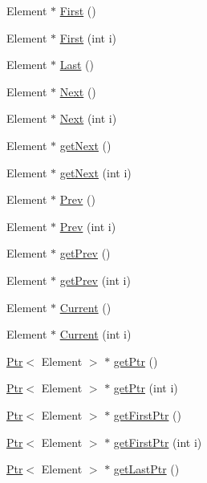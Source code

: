 \begin{CompactItemize}
\item 
Element $\ast$ \hyperlink{classContainer_01da95c79542f8a2e770fce83a99928f}{First} ()
\item 
Element $\ast$ \hyperlink{classContainer_d8149821d1af2a00534c8aacf7a8b847}{First} (int i)
\item 
Element $\ast$ \hyperlink{classContainer_69c8bc0d0f09e172057777ee8604b228}{Last} ()
\item 
Element $\ast$ \hyperlink{classContainer_07f6034601c7bb0379e7e3669a86bdda}{Next} ()
\item 
Element $\ast$ \hyperlink{classContainer_fccf98c4426883812b085ff0d9b610dc}{Next} (int i)
\item 
Element $\ast$ \hyperlink{classContainer_fd45917f5293ac94750cd8c1c5c2c4a9}{getNext} ()
\item 
Element $\ast$ \hyperlink{classContainer_027eaac76676e187ae5f849acb84237a}{getNext} (int i)
\item 
Element $\ast$ \hyperlink{classContainer_80e55ec0997a0af36e7f1326cd8c9e6d}{Prev} ()
\item 
Element $\ast$ \hyperlink{classContainer_6cc7f2c5e4d929dab3afdbdd1d193d14}{Prev} (int i)
\item 
Element $\ast$ \hyperlink{classContainer_980834c42829d68fd640a86aa9d8051e}{getPrev} ()
\item 
Element $\ast$ \hyperlink{classContainer_b75a038f82adad65e3b202b6843cdb4c}{getPrev} (int i)
\item 
Element $\ast$ \hyperlink{classContainer_cbf0295eef7a11efdb07137014ab7e0c}{Current} ()
\item 
Element $\ast$ \hyperlink{classContainer_fbd992e0044ce433a8acd6015a9d876c}{Current} (int i)
\item 
\hyperlink{structPtr}{Ptr}$<$ Element $>$ $\ast$ \hyperlink{classContainer_542e2401c60213071a387ab65fd49814}{getPtr} ()
\item 
\hyperlink{structPtr}{Ptr}$<$ Element $>$ $\ast$ \hyperlink{classContainer_fbc047571e5612343d92794004a947ae}{getPtr} (int i)
\item 
\hyperlink{structPtr}{Ptr}$<$ Element $>$ $\ast$ \hyperlink{classContainer_e2e40811d9c94c5655c21eec097c3c3c}{getFirstPtr} ()
\item 
\hyperlink{structPtr}{Ptr}$<$ Element $>$ $\ast$ \hyperlink{classContainer_a2a2567f909060ce9fd33ef25bfbe2cb}{getFirstPtr} (int i)
\item 
\hyperlink{structPtr}{Ptr}$<$ Element $>$ $\ast$ \hyperlink{classContainer_cd55bbaf66ebd95774e796d878dbdf7b}{getLastPtr} ()

\end{CompactItemize}
